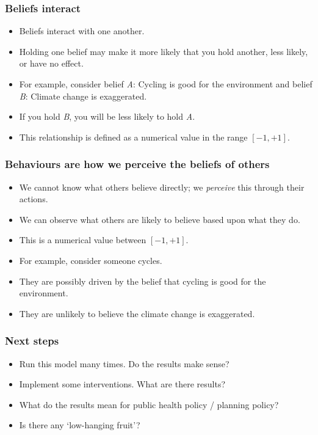 \documentclass[aspectratio=169]{beamer}
\begin{document}
\begin{frame}
    \frametitle{Beliefs interact}
    \begin{itemize}
        \item Beliefs interact with one another.
        \item Holding one belief may make it more likely that you hold another, less likely, or have no effect.
        \item For example, consider belief \emph{A}: Cycling is good for the environment and belief \emph{B}: Climate change is exaggerated.
        \item If you hold \emph{B}, you will be less likely to hold \emph{A}.
        \item This relationship is defined as a numerical value in the range \([-1, +1]\).
    \end{itemize}
\end{frame}

\begin{frame}
    \frametitle{Behaviours are how we perceive the beliefs of others}
    \begin{itemize}
        \item We cannot know what others believe directly; we \emph{perceive} this through their actions.
        \item We can observe what others are likely to believe based upon what they do.
        \item This is a numerical value between \([-1, +1]\).
        \item For example, consider someone cycles.
        \item They are possibly driven by the belief that cycling is good for the environment.
        \item They are unlikely to believe the climate change is exaggerated.
    \end{itemize}
\end{frame}

\begin{frame}
    \frametitle{Next steps}
    \begin{itemize}
        \item Run this model many times. Do the results make sense?
        \item Implement some interventions. What are there results?
        \item What do the results mean for public health policy / planning policy?
        \item Is there any `low-hanging fruit'?
    \end{itemize}
\end{frame}
\end{document}
